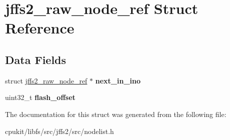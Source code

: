 \hypertarget{structjffs2__raw__node__ref}{}\section{jffs2\+\_\+raw\+\_\+node\+\_\+ref Struct Reference}
\label{structjffs2__raw__node__ref}
\subsection*{Data Fields}
\begin{DoxyCompactItemize}
\item 
\mbox{\label{structjffs2__raw__node__ref_abc6a1b4ab85229caf792e5b3f2ebd844}} 
struct \mbox{\hyperlink{structjffs2__raw__node__ref}{jffs2\+\_\+raw\+\_\+node\+\_\+ref}} $\ast$ {\bfseries next\+\_\+in\+\_\+ino}
\item 
\mbox{\label{structjffs2__raw__node__ref_a2e972b87ddff57ac96d00179405b8d9a}} 
uint32\+\_\+t {\bfseries flash\+\_\+offset}
\end{DoxyCompactItemize}


The documentation for this struct was generated from the following file\+:\begin{DoxyCompactItemize}
\item 
cpukit/libfs/src/jffs2/src/nodelist.\+h\end{DoxyCompactItemize}
